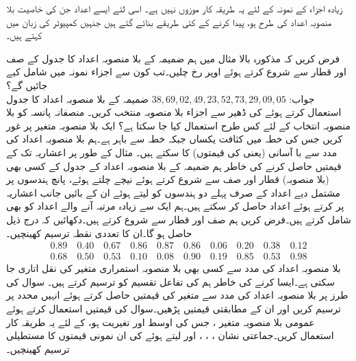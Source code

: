 زیادہ اجزاء کے نمونہ کے لئے  یہ طریقہ کار  موزوں نہیں ہے۔ اسی لئے  ایسے اعداد جن کی خاصیت بلا منصوبہ اعداد کی طرح ہو،  پیدا کرنے کے کئی طریقے بنائے گئے ہیں جنہیں کمپیوٹر کی زبان میں  کہتے ہیں۔

\quad
فرض کریں کہ مذکورہ بالا مثال میں ہم ضمیمہ  کے بلا منصوبہ اعداد کا جدول کے صف  اور قطار  سے شروع کرتے ہوئے اوپر رخ چلیں۔تب کون سے اجزاء نمونہ میں شامل کیے جائیں گے؟\\
جواب:\quad
$38,69,02,49,23,52,73,29,09,05$
\quad
ضمیمہ  کے بلا منصوبہ اعداد کا جدول استعمال کرتے ہوئے  کی ڈھیر سے  اجزاء بلا منصوبہ منتخب کریں۔
\quad
منصفانہ پانسہ کو بلا منصوبہ انتخاب کے لئے کس طرح استعمال کیا جا سکتا ہے؟
\quad
ایک بلا منصوبہ متغیر  پر غور کریں جس کی خطہ  میں کثافت یکساں   جبکہ خطہ سے باہر  ہے۔ہم بلا منصوبہ اعداد کی مدد سے با آسانی  (یعنی  کی قیمتوں) کا   سکتے ہیں۔ مثال کے طور پر  اعشاریہ تک کے  قیمتیں حاصل کرنے کی خاطر ہم ضمیمہ  کے بلا منصوبہ اعداد کے جدول کے کسی بھی (بلا منصوبہ) قطار اور صف سے شروع کرتے ہوئے نیچے چلتے ہوئے، پانچ ہندسوں پر مشتمل دیے اعداد کے صرف پہلے دو ہندسوں کو لیتے ہوئے ان کے بائیں جانب اعشاریہ پر کرتے ہوئے اعداد حاصل کر سکتے ہیں۔ہم ایک سے زیادہ مرتبہ آنے والے اعداد کو بھی شامل کرتے ہیں۔فرض کریں ہم صف  اور قطار  سے شروع کرتے ہیں۔دکھائیں کہ درج ذیل حاصل ہو گا۔ان کا تعددی نقطہ ترسیم کھینچیں۔
\begin{align*}
0.89\quad 0.40\quad 0.67\quad 0.86\quad 0.87\quad 0.86\quad 0.06\quad 0.20\quad 0.38\quad 0.12\\
0.68\quad 0.50\quad 0.53\quad 0.10\quad 0.08\quad 0.90\quad 0.19\quad 0.85\quad 0.53\quad 0.98
\end{align*}
\quad
بلا منصوبہ اعداد کی مدد سے کسی بھی بلا منصوبہ استمراری متغیر  کی نقل اتاری جا سکتی ہے۔ایسا کرنے کی خاطر ہم  کی تفاعل تقسیم کو ترسیم کرتے ہیں۔ سوال  کی طرز پر بلا منصوبہ اعداد کی مدد سے متغیر  کی قیمتیں حاصل کرتے ہوئے انہیں  محدد پر ترسیم کریں اور ان کے مطابقتی  قیمتیں پڑھیں۔سوال  کی قیمتیں استعمال کرتے ہوئے عمومی بلا منصوبہ متغیر ، جس کی اوسط  اور تغیریت  ہو، کے لئے یہ طریقہ کار استعمال کریں۔جماعتی نشان ، ، ،  اور  لیتے ہوئے   کی ان  نمونی قیمتوں کا مستطیلی ترسیم  کھینچیں۔\\
